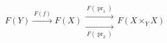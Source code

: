 \(
F(Y)\xrightarrow{\ F(f)\ }F(X)
\mathrel{\substack{\xrightarrow{\ F(\operatorname{pr}_1)\ }\\[-.7ex]
                   \xrightarrow[\ F(\operatorname{pr}_2)\ ]{}}}
F(X\times_YX)
\)
